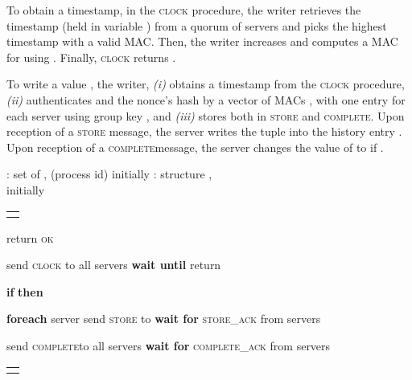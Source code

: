 \documentclass[10pt,conference,compsocconf]{IEEEtran}
\newcommand{\mprotocol}{M-PoWerStore}
\newcommand{\complete}{\textsc{complete}}
\begin{document}
To obtain a timestamp, in the \textsc{clock} procedure, the writer retrieves the timestamp (held in variable ) from a quorum of  servers and picks the highest timestamp  with a valid MAC. Then, the writer increases  and computes a MAC for  using . Finally, \textsc{clock} returns .

To write a value , the writer, \emph{(i)} obtains a timestamp  from the \textsc{clock} procedure, \emph{(ii)} authenticates  and the nonce's hash  by a vector of MACs , with one entry for each server  using group key , and \emph{(iii)} stores  both in \textsc{store} and \complete. Upon reception of a \textsc{store} message, the server writes the tuple  into the history entry . Upon reception of a \complete message, the server changes the value of  to  if .


\begin{algo}[t]
\small


\begin{distribalgo}[1] \setcounter{ALC@line}{\value{alg:client1:lines}}
\smallskip
{}
\STATE : set of , (process id) initially 
\STATE : structure ,\\ initially   
\ENDINDENT
\setcounter{alg:client1:lines}{\value{ALC@line}}
\end{distribalgo}
\begin{tabular}{c}\hline\mbox{}\hspace{0.45\textwidth}\mbox{}\end{tabular}
\vspace{-2 em}
\begin{distribalgo}[1]  \setcounter{ALC@line}{\value{alg:client1:lines}}
\STATE 
\STATE  \label{alg2:writer:clock}
\STATE 
\STATE 
\STATE 
\STATE  \label{alg2:writer:store}
\STATE  \label{alg2:writer:complete}
\STATE return \textsc{ok}
\ENDINDENT

\medskip
{}
\STATE send \textsc{clock} to all servers
\STATE \textbf{wait until} 
\STATE 
\STATE 
\STATE return 
\ENDINDENT

\smallskip
{}
\STATE 
\STATE \textbf{if}  \textbf{then}  \label{alg2:writer:ts-integrity}
\ENDINDENT

\medskip
{}
\STATE 
\STATE 
\STATE \textbf{foreach} server  send \textsc{store} to 
\STATE \textbf{wait for} \textsc{store\_ack} from  servers
\ENDINDENT

\medskip
\INDENT {\textbf{procedure} \complete()}
\STATE send \complete to all servers
\STATE \textbf{wait for} \textsc{\complete\_ack} from  servers
\ENDINDENT

\setcounter{alg:client1:lines}{\value{ALC@line}}

\end{distribalgo}
\begin{tabular}{c}\hline\mbox{}\hspace{0.45\textwidth}\mbox{}\end{tabular}
\caption{{Algorithm of writer  in \mprotocol.}}\label{alg2:writer}
\end{algo}
\end{document}
